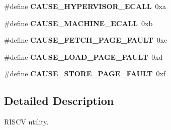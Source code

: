 \begin{DoxyCompactItemize}
\item 
\mbox{\label{riscv-utility_8h_a9127266f95abeacd50926e1ac29c0885}} 
\#define {\bfseries C\+A\+U\+S\+E\+\_\+\+H\+Y\+P\+E\+R\+V\+I\+S\+O\+R\+\_\+\+E\+C\+A\+LL}~0xa
\item 
\mbox{\label{riscv-utility_8h_a19461c8df4bce8af932c6bcbcdc302ea}} 
\#define {\bfseries C\+A\+U\+S\+E\+\_\+\+M\+A\+C\+H\+I\+N\+E\+\_\+\+E\+C\+A\+LL}~0xb
\item 
\mbox{\label{riscv-utility_8h_acacff8f595ef16b915e266c1caf7becc}} 
\#define {\bfseries C\+A\+U\+S\+E\+\_\+\+F\+E\+T\+C\+H\+\_\+\+P\+A\+G\+E\+\_\+\+F\+A\+U\+LT}~0xc
\item 
\mbox{\label{riscv-utility_8h_aea484b7219fc38547f7b20c8bf264efe}} 
\#define {\bfseries C\+A\+U\+S\+E\+\_\+\+L\+O\+A\+D\+\_\+\+P\+A\+G\+E\+\_\+\+F\+A\+U\+LT}~0xd
\item 
\mbox{\label{riscv-utility_8h_ac105f6c51ffa8660f7f4ba7b07acd29c}} 
\#define {\bfseries C\+A\+U\+S\+E\+\_\+\+S\+T\+O\+R\+E\+\_\+\+P\+A\+G\+E\+\_\+\+F\+A\+U\+LT}~0xf
\end{DoxyCompactItemize}


\subsection{Detailed Description}
R\+I\+S\+CV utility. 

